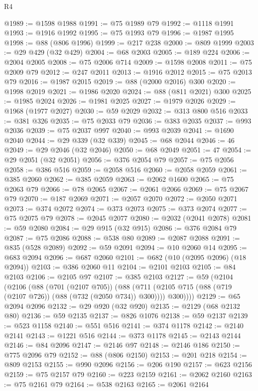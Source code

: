 \begin{lexlean}{R4}
\begin{coremodule}
{{{{{{{{{{{{{{{{{{{{{{{{{{{{{{{{{{{{{{{{{{{{{{{{{{{{{{{{{{{{{{{{{{{{{{{{{{{{{{{{{{{{{{{{{{{{@1989 := @1598 @1988
@1991 := @75 @1989 @79
@1992 := @1118 @1991
@1993 := @1916 @1992
@1995 := @75 @1993 @79
@1996 := @1987 @1995
@1998 := @88 (@806 @1996)
@1999 := @217 @238
@2000 := @809 @1999
@2003 := @29 @429 (@32 @429)
@2004 := @68 @2003
@2005 := @189 @224
@2006 := @2004 @2005
@2008 := @75 @2006 @714
@2009 := @1598 @2008
@2011 := @75 @2009 @79
@2012 := @247 @2011
@2013 := @1916 @2012
@2015 := @75 @2013 @79
@2016 := @1987 @2015
@2019 := @88 (@2000 @2016) @300
@2020 := @1998 @2019
@2021 := @1986 @2020
@2024 := @88 (@811 @2021) @300
@2025 := @1985 @2024
@2026 := @1981 @2025
@2027 := @1979 @2026
@2029 := @1968 (@1977 @2027)
@2030 := @59 @2029
@2032 := @313 @800 @516
@2033 := @381 @326
@2035 := @75 @2033 @79
@2036 := @383 @2035
@2037 := @993 @2036
@2039 := @75 @2037 @997
@2040 := @993 @2039
@2041 := @1690 @2040
@2044 := @29 @339 (@32 @339)
@2045 := @68 @2044
@2046 := 46
@2049 := @29 @2046 (@32 @2046)
@2050 := @68 @2049
@2051 := 47
@2054 := @29 @2051 (@32 @2051)
@2056 := @376 @2054 @79
@2057 := @75 @2056
@2058 := @386 @516
@2059 := @2058 @516
@2060 := @2058 @2059
@2061 := @385 @2060
@2062 := @385 @2059
@2063 := @2062 @1600
@2065 := @75 @2063 @79
@2066 := @78 @2065
@2067 := @2061 @2066
@2069 := @75 @2067 @79
@2070 := @187 @2069
@2071 := @2057 @2070
@2072 := @2050 @2071
@2073 := @374 @2072
@2074 := @373 @2073
@2075 := @373 @2074
@2077 := @75 @2075 @79
@2078 := @2045 @2077
@2080 := @2032 (@2041 @2078)
@2081 := @59 @2080
@2084 := @29 @915 (@32 @915)
@2086 := @376 @2084 @79
@2087 := @75 @2086
@2088 := @538 @80
@2089 := @2087 @2088
@2091 := @835 (@528 @2089)
@2092 := @59 @2091
@2094 := @10 @2060 @14
@2095 := @683 @2094
@2096 := @687 @2060
@2101 := @682 (@10 (@2095 @2096) (@18 @2094))
@2103 := @386 @2060 @11
@2104 := @2101 @2103
@2105 := @84 @2103
@2106 := @2105 @97
@2107 := @385 @2103
@2127 := @59
    (@2104
      (@2106
        (@88
          (@701 (@2107 @705))
          (@88 (@711 (@2105 @715 (@88 (@719 (@2107 @726)) (@88 (@732 (@2050 @734)) @300)))) @300))))
@2129 := @65 @2094 @2096
@2132 := @29 @920 (@32 @920)
@2135 := @2129 (@68 @2132 @80)
@2136 := @59 @2135
@2137 := @826 @1076
@2138 := @59 @2137
@2139 := @523 @1158
@2140 := @551 @516
@2141 := @374 @1178
@2142 := @2140 @2141
@2143 := @1221 @516
@2144 := @373 @1178
@2145 := @2143 @2144
@2146 := @84 @2096
@2147 := @2146 @97
@2148 := @2146 @186
@2150 := @775 @2096 @79
@2152 := @88 (@806 @2150)
@2153 := @201 @218
@2154 := @809 @2153
@2155 := @990 @2096
@2156 := @206 @190
@2157 := @623 @2156
@2159 := @75 @2157 @79
@2160 := @223 @2159
@2161 := @2062 @2160
@2163 := @75 @2161 @79
@2164 := @538 @2163
@2165 := @2061 @2164
}}}}}}}}}}}}}}}}}}}}}}}}}}}}}}}}}}}}}}}}}}}}}}}}}}}}}}}}}}}}}}}}}}}}}}}}}}}}}}}}}}}}}}}}}}}}
\end{coremodule}
\end{lexlean}
